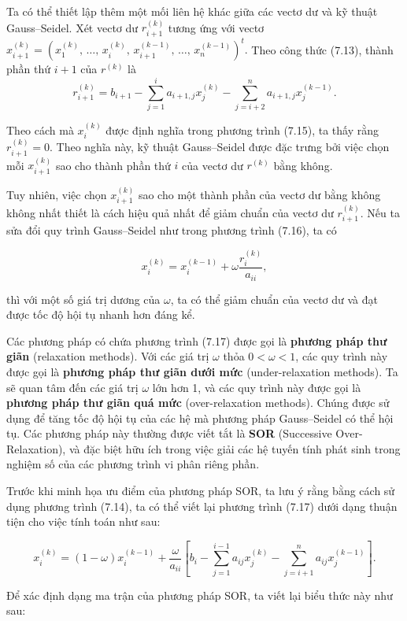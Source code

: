 Ta có thể thiết lập thêm một mối liên hệ khác giữa các vectơ dư và kỹ thuật Gauss--Seidel. 
Xét vectơ dư \( r^{(k)}_{i+1} \) tương ứng với vectơ 
\(
x_{i+1}^{(k)} = (x^{(k)}_1,\, \ldots,\, x^{(k)}_i,\, x^{(k-1)}_{i+1},\, \ldots,\, x^{(k-1)}_n)^{t}.
\)
Theo công thức (7.13), thành phần thứ \( i+1 \) của \( r^{(k)} \) là
\[
r^{(k)}_{i+1} = b_{i+1} - \sum_{j=1}^{i} a_{i+1,j}x^{(k)}_j - \sum_{j=i+2}^{n} a_{i+1,j}x^{(k-1)}_j.
\]

Theo cách mà \( x_i^{(k)} \) được định nghĩa trong phương trình (7.15), ta thấy rằng \( r_{i+1}^{(k)} = 0 \). 
Theo nghĩa này, kỹ thuật Gauss--Seidel được đặc trưng bởi việc chọn mỗi \( x_{i+1}^{(k)} \) sao cho 
thành phần thứ \( i \) của vectơ dư \( r^{(k)} \) bằng không.

Tuy nhiên, việc chọn \( x_{i+1}^{(k)} \) sao cho một thành phần của vectơ dư bằng không 
không nhất thiết là cách hiệu quả nhất để giảm chuẩn của vectơ dư \( r_{i+1}^{(k)} \). 
Nếu ta sửa đổi quy trình Gauss--Seidel như trong phương trình (7.16), ta có

\[
x_i^{(k)} = x_i^{(k-1)} + \omega \frac{r_i^{(k)}}{a_{ii}}, \tag{7.17}
\]

thì với một số giá trị dương của \( \omega \), ta có thể giảm chuẩn của vectơ dư và 
đạt được tốc độ hội tụ nhanh hơn đáng kể.

Các phương pháp có chứa phương trình (7.17) được gọi là \textbf{phương pháp thư giãn} (relaxation methods).  
Với các giá trị \( \omega \) thỏa \( 0 < \omega < 1 \), các quy trình này được gọi là \textbf{phương pháp thư giãn dưới mức} (under-relaxation methods).  
Ta sẽ quan tâm đến các giá trị \( \omega \) lớn hơn 1, và các quy trình này được gọi là \textbf{phương pháp thư giãn quá mức} (over-relaxation methods).  
Chúng được sử dụng để tăng tốc độ hội tụ của các hệ mà phương pháp Gauss--Seidel có thể hội tụ.  
Các phương pháp này thường được viết tắt là \textbf{SOR} (Successive Over-Relaxation), 
và đặc biệt hữu ích trong việc giải các hệ tuyến tính phát sinh trong nghiệm số của các phương trình vi phân riêng phần.

Trước khi minh họa ưu điểm của phương pháp SOR, ta lưu ý rằng bằng cách sử dụng phương trình (7.14), 
ta có thể viết lại phương trình (7.17) dưới dạng thuận tiện cho việc tính toán như sau:

\[
x_i^{(k)} = (1 - \omega)x_i^{(k-1)} + \frac{\omega}{a_{ii}}
\left[
b_i - \sum_{j=1}^{i-1} a_{ij}x_j^{(k)} - \sum_{j=i+1}^{n} a_{ij}x_j^{(k-1)}
\right].
\]

Để xác định dạng ma trận của phương pháp SOR, ta viết lại biểu thức này như sau:


